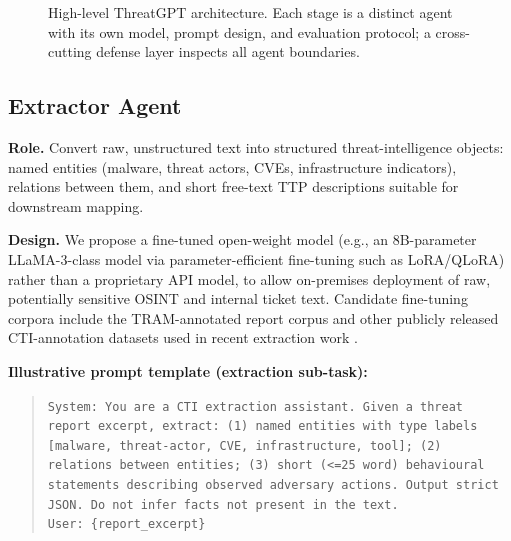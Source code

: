 \documentclass[runningheads]{llncs}
\begin{document}
\begin{figure}[t]
\centering
{}
\caption{High-level ThreatGPT architecture. Each stage is a distinct agent with its own model, prompt design, and evaluation protocol; a cross-cutting defense layer inspects all agent boundaries.}
\label{fig:architecture}
\end{figure}

\subsection{Extractor Agent}

\textbf{Role.} Convert raw, unstructured text into structured threat-intelligence objects: named entities (malware, threat actors, CVEs, infrastructure indicators), relations between them, and short free-text TTP descriptions suitable for downstream mapping.

\textbf{Design.} We propose a fine-tuned open-weight model (e.g., an 8B-parameter LLaMA-3-class model via parameter-efficient fine-tuning such as LoRA/QLoRA) rather than a proprietary API model, to allow on-premises deployment of raw, potentially sensitive OSINT and internal ticket text. Candidate fine-tuning corpora include the TRAM-annotated report corpus \cite{tramtool} and other publicly released CTI-annotation datasets used in recent extraction work \cite{ctinexus2024,intelex2024}.

\textbf{Illustrative prompt template (extraction sub-task):}
\begin{quote}\small
\texttt{System: You are a CTI extraction assistant. Given a threat report excerpt, extract: (1) named entities with type labels [malware, threat-actor, CVE, infrastructure, tool]; (2) relations between entities; (3) short (<=25 word) behavioural statements describing observed adversary actions. Output strict JSON. Do not infer facts not present in the text.}\\
\texttt{User: \{report\_excerpt\}}
\end{quote}
\end{document}
